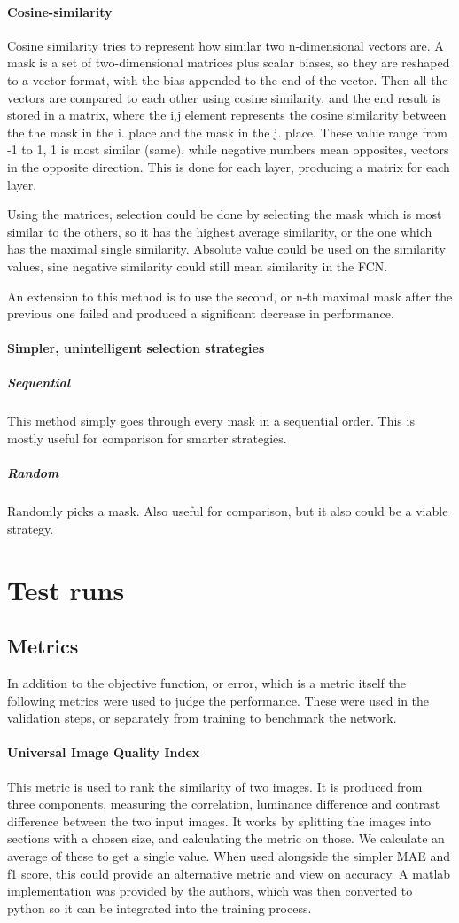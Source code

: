 \documentclass[a4paper,12pt]{article}
\begin{document}
\paragraph{Cosine-similarity}Cosine similarity  tries to represent how similar two n-dimensional vectors are. A mask is a set of two-dimensional matrices plus scalar biases, so they are reshaped to a vector format, with the bias appended to the end of the vector. Then all the vectors are compared to each other using cosine similarity, and the end result is stored in a matrix, where the i,j element represents the cosine similarity between the the mask in the i. place and the mask in the j. place. These value range from -1 to 1, 1 is most similar (same), while negative numbers mean opposites, vectors in the opposite direction. This is done for each layer, producing a matrix for each layer.\par
Using the matrices, selection could be done by selecting the mask which is most similar to the others, so it has the highest average similarity, or the one which has the maximal single similarity. Absolute value could be used on the similarity values, sine negative similarity could still mean similarity in the FCN.\par
An extension to this method is to use the second, or n-th maximal mask after the previous one failed and produced a significant decrease in performance.
\paragraph{Simpler, unintelligent selection strategies}
\subparagraph{Sequential}This method simply goes through every mask in a sequential order. This is mostly useful for comparison for smarter strategies.
\subparagraph{Random}
Randomly picks a mask. Also useful for comparison, but it also could be a viable strategy.
\section{Test runs}
\subsection{Metrics}
In addition to the objective function, or error, which is a metric itself the following metrics were used to judge the performance. These were used in the validation steps, or separately from training to benchmark the network.
\paragraph{Universal Image Quality Index}This metric is used to rank the similarity of two images. It is produced from three components, measuring the correlation, luminance difference and contrast difference between the two input images. It works by splitting the images into sections with a chosen size, and calculating the metric on those. We calculate an average of these to get a single value. When used alongside the simpler MAE and f1 score, this could provide an alternative metric and view on accuracy. A matlab implementation was provided by the authors, which was then converted to python so it can be integrated into the training process.
\end{document}
